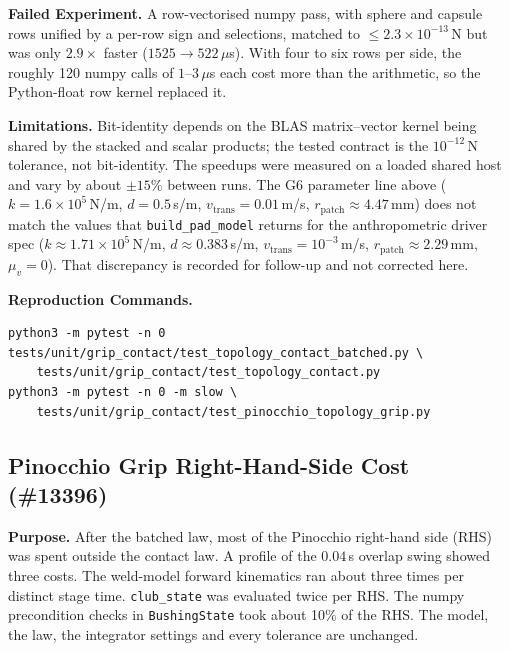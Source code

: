 \documentclass[11pt,a4paper]{article}
\begin{document}
\textbf{Failed Experiment.} A row-vectorised numpy pass, with sphere and capsule rows unified by a per-row sign and
selections, matched to $\le 2.3\times10^{-13}$\,N but was only $2.9\times$ faster ($1525 \to 522\,\mu$s). With four to six
rows per side, the roughly 120 numpy calls of $1$--$3\,\mu$s each cost more than the arithmetic, so the Python-float row
kernel replaced it.

\textbf{Limitations.} Bit-identity depends on the BLAS matrix--vector kernel being shared by the stacked and scalar
products; the tested contract is the $10^{-12}$\,N tolerance, not bit-identity. The speedups were measured on a loaded
shared host and vary by about $\pm15\%$ between runs. The G6 parameter line above ($k = 1.6\times10^5$\,N/m, $d = 0.5$\,s/m,
$v_{\mathrm{trans}} = 0.01$\,m/s, $r_{\mathrm{patch}} \approx 4.47$\,mm) does not match the values that
\texttt{build\_pad\_model} returns for the anthropometric driver spec ($k \approx 1.71\times10^5$\,N/m, $d \approx 0.383$\,s/m,
$v_{\mathrm{trans}} = 10^{-3}$\,m/s, $r_{\mathrm{patch}} \approx 2.29$\,mm, $\mu_v = 0$). That discrepancy is recorded for
follow-up and not corrected here.

\textbf{Reproduction Commands.}
\begin{verbatim}
python3 -m pytest -n 0 tests/unit/grip_contact/test_topology_contact_batched.py \
    tests/unit/grip_contact/test_topology_contact.py
python3 -m pytest -n 0 -m slow \
    tests/unit/grip_contact/test_pinocchio_topology_grip.py
\end{verbatim}

\subsection{Pinocchio Grip Right-Hand-Side Cost (\#13396)}
\textbf{Purpose.} After the batched law, most of the Pinocchio right-hand side (RHS) was spent outside the contact law.
A profile of the $0.04$\,s overlap swing showed three costs. The weld-model forward kinematics ran about three times
per distinct stage time. \texttt{club\_state} was evaluated twice per RHS. The numpy precondition checks in
\texttt{BushingState} took about 10\% of the RHS. The model, the law, the integrator settings and every tolerance are
unchanged.
\end{document}
